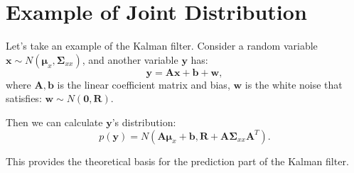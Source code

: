 \section{Example of Joint Distribution}
\label{sec:gauss-example}
Let's take an example of the Kalman filter. Consider a random variable $\mathbf{x} \sim N( \boldsymbol{\mu}_x, \boldsymbol{\Sigma}_{xx})$, and another variable $\mathbf{y}$ has:
\begin{equation}
\mathbf{y} = \mathbf{Ax} + \mathbf{b} + \mathbf{w},
\end{equation}
where $\mathbf{A}, \mathbf{b}$ is the linear coefficient matrix and bias, $\mathbf{w}$ is the white noise that satisfies: $\mathbf{w} \sim N(\mathbf{0}, \mathbf{R})$.

Then we can calculate $\mathbf{y}$'s distribution:
\begin{equation}
p\left( \mathbf{y} \right) = N\left( {\mathbf{A}{\boldsymbol{\mu}_x} + \mathbf{b}, \mathbf{R} + \mathbf{A} {\boldsymbol{\Sigma}_{xx}}{\mathbf{A}^T}} \right).
\end{equation}

This provides the theoretical basis for the prediction part of the Kalman filter.